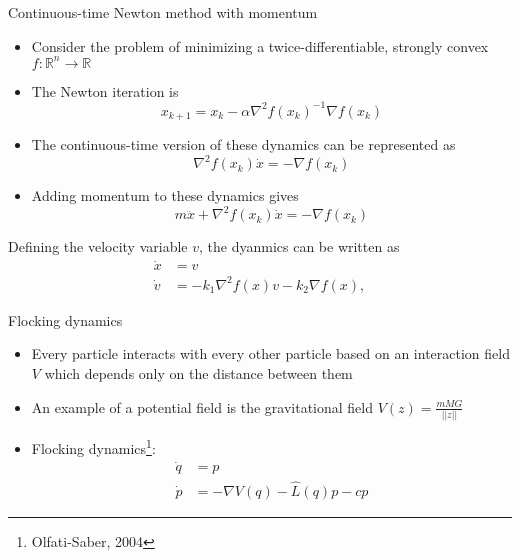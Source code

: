 \begin{frame}{Continuous-time Newton method with momentum}
\begin{itemize}
	\item Consider the problem of minimizing a twice-differentiable, strongly convex $f:\mathbb{R}^n\rightarrow \mathbb{R}$
	\pause
	\item The Newton iteration is
	\begin{equation}
	x_{k+1}=x_k - \alpha\nabla^2f(x_k)^{-1} \nabla f(x_k)
	\end{equation}
	\pause
	\item The continuous-time version of these dynamics can be represented as
	\begin{equation}
	\nabla^2f(x_k)\dot{x}= - \nabla f(x_k)
	\end{equation}
	\pause
	\item Adding momentum to these dynamics gives  
	\begin{equation}
	m\ddot{x}+ \nabla^2f(x_k)\dot{x}= - \nabla f(x_k)
	\end{equation}
\end{itemize}
\pause
Defining the velocity variable $v$, the dyanmics can be written as 
\begin{equation} \label{eqn: second_order_newton_cont_time}
\begin{split}
\Dot{x}&=v\\
\Dot{v}&=-k_1\nabla^2 f(x) v -k_2 \nabla f(x), 
\end{split}
\end{equation}
\end{frame}
\begin{frame}{Flocking dynamics}
\begin{itemize}
	\item Every particle interacts with every other particle based on an interaction field $V$ which depends only on the distance between them
	\item An example of a potential field is the gravitational field $V(z)=\frac{mMG}{||z||}$
	\item Flocking dynamics\footnote{Olfati-Saber, 2004}:
	\begin{equation*}
	\begin{split}
	\Dot{q}&=p\\
	\Dot{p}&=-\nabla V(q)-\hat{L}(q)p -cp 
	\end{split}
	\end{equation*}
\end{itemize}
\end{frame}

